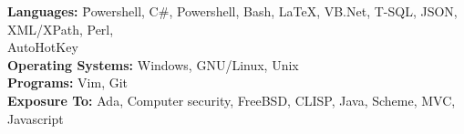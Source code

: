 

\begin{cvparagraph}

   \begin{tabbing}

      \textbf{Languages:} \hspace{5pc} \=
      Powershell, C\#, Powershell, Bash, \LaTeX, VB.Net, T-SQL, JSON, XML/XPath, Perl, \\ 
      \>AutoHotKey \\

      \textbf{Operating Systems:} \>
      Windows, GNU/Linux, Unix \\
      
      \textbf{Programs:} \>
      Vim, Git \\

      \textbf{Exposure To:} \>
      Ada, Computer security, FreeBSD, CLISP, Java, Scheme, MVC, Javascript

   \end{tabbing}

\end{cvparagraph}
